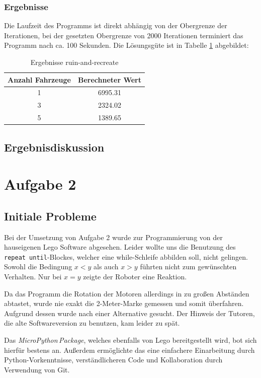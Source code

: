 \documentclass[ngerman]{tudscrreprt}
\newcommand{\code}[1]{\texttt{#1}}
\begin{document}
\subsection{Ergebnisse}
Die Laufzeit des Programms ist direkt abhängig von der Obergrenze der Iterationen,
bei der gesetzten Obergrenze von \num{2000} Iterationen terminiert das Programm
nach ca. 100 Sekunden.
Die Lösungsgüte ist in Tabelle \ref{table:ruin-and-recreate} abgebildet:
%
\begin{table}[H]
    \centering
    \begin{tabular}{|c|c|}
    \hline
    Anzahl Fahrzeuge & Berechneter Wert \\ \hline
    1                & \num{6995.31}    \\ \hline
    3                & \num{2324.02}    \\ \hline
    5                & \num{1389.65}    \\ \hline
    \end{tabular}
    \caption{Ergebnisse ruin-and-recreate}
    \label{table:ruin-and-recreate}
\end{table}

\section{Ergebnisdiskussion}

\chapter{Aufgabe 2}
\section{Initiale Probleme}
Bei der Umsetzung von Aufgabe 2 wurde zur Programmierung von der hauseigenen Lego Software abgesehen. Leider wollte uns die Benutzung des \code{repeat until}-Blockes, welcher eine while-Schleife abbilden soll, nicht gelingen. Sowohl die Bedingung $x < y$ als auch $x > y$ führten nicht zum gewünschten Verhalten. Nur bei $x = y$ zeigte der Roboter eine Reaktion.

Da das Programm die Rotation der Motoren allerdings in zu großen Abständen abtastet, wurde nie exakt die 2-Meter-Marke gemessen und somit überfahren. Aufgrund dessen wurde nach einer Alternative gesucht. Der Hinweis der Tutoren, die alte Softwareversion zu benutzen, kam leider zu spät.

Das \emph{MicroPython\,Package}, welches ebenfalls von Lego bereitgestellt wird, bot sich hierfür bestens an. Außerdem ermöglichte das eine einfachere Einarbeitung durch Python-Vorkenntnisse, verständlicheren Code und Kollaboration durch Verwendung von Git.
\end{document}
